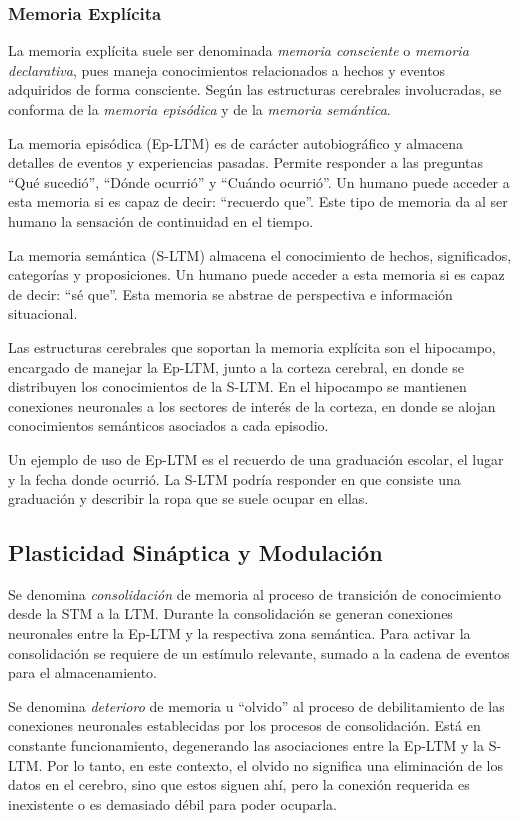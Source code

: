 \subsubsection{Memoria Explícita}

La memoria explícita suele ser denominada \textit{memoria consciente} o \textit{memoria declarativa}, pues maneja conocimientos relacionados a hechos y eventos adquiridos de forma consciente. Según las estructuras cerebrales involucradas, se conforma de la \textit{memoria episódica} y de la \textit{memoria semántica}.

La memoria episódica (Ep-LTM) es de carácter  autobiográfico y almacena detalles de eventos y experiencias pasadas. Permite responder a las preguntas ``Qué sucedió'', ``Dónde ocurrió'' y ``Cuándo ocurrió''. Un humano puede acceder a esta memoria si es capaz de decir: ``recuerdo que''. Este tipo de memoria da al ser humano la sensación de continuidad en el tiempo.

La memoria semántica (S-LTM) almacena el conocimiento de hechos, significados, categorías y proposiciones. Un humano puede acceder a esta memoria si es capaz de decir: ``sé que''. Esta memoria se abstrae de perspectiva e información situacional.

Las estructuras cerebrales que soportan la memoria explícita son el hipocampo, encargado de manejar la Ep-LTM, junto a la corteza cerebral, en donde se distribuyen los conocimientos de la S-LTM. En el hipocampo se mantienen conexiones neuronales a los sectores de interés de la corteza, en donde se alojan conocimientos semánticos asociados a cada episodio.

Un ejemplo de uso de Ep-LTM es el recuerdo de una graduación escolar, el lugar y la fecha donde ocurrió. La S-LTM podría responder en que consiste una graduación y describir la ropa que se suele ocupar en ellas.


\subsection{Plasticidad Sináptica y Modulación}

Se denomina \textit{consolidación} de memoria al proceso de transición de conocimiento desde la STM a la LTM. Durante la consolidación se generan conexiones neuronales entre la Ep-LTM y la respectiva zona semántica. Para activar la consolidación se requiere de un estímulo relevante, sumado a la cadena de eventos para el almacenamiento.

Se denomina \textit{deterioro} de memoria u ``olvido'' al proceso de debilitamiento de las conexiones neuronales establecidas por los procesos de consolidación. Está en constante funcionamiento, degenerando las asociaciones entre la Ep-LTM y la S-LTM. Por lo tanto, en este contexto, el olvido no significa una eliminación de los datos en el cerebro, sino que estos siguen ahí, pero la conexión requerida es inexistente o es demasiado débil para poder ocuparla.

